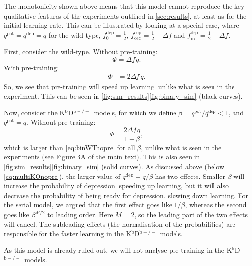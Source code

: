 \documentclass[10pt]{article}
\newcommand{\pot}{^{\text{pot}}}
\newcommand{\dep}{^{\text{dep}}}
\newcommand{\inc}{_{\text{inc}}}
\newcommand{\dec}{_{\text{dec}}}
\newcommand{\KO}{K$^\mathrm{b}$D$^{\mathrm{b}-/-}$}
\newcommand{\modelfig}[1][A]{Figure 3#1 of the main text}
\begin{document}
The monotonicity shown above means that this model cannot reproduce the key qualitative features of the experiments outlined in \autoref{sec:results}, at least as for the initial learning rate.
This can be illustrated by looking at a special case, where $q\pot = q\dep = q$ for the wild type, $f\dep_0 = \frac{1}{2}$, $f\dep\dec = \frac{1}{2} - \Delta f$ and $f\dep\inc = \frac{1}{2} - \Delta f$.

First, consider the wild-type.
Without pre-training:
%
\begin{equation}\label{eq:binWTnopre}
  \Phi = {\Delta f}\, q.
\end{equation}
%
With pre-training:
%
\begin{equation}\label{eq:binWTpre}
\begin{aligned}
  \Phi &= 2{\Delta f}\, q.
\end{aligned}
\end{equation}
%
So, we see that pre-training will speed up learning, unlike what is seen in the experiment.
This can be seen in
\autoref{fig:sim_results}\ref{fig:binary_sim} %
(black curves).

Now, consider the \KO\ models, for which we define $\beta=q\pot/q\dep<1$, and $q\pot=q$.
Without pre-training:
%
\begin{equation}\label{eq:binKOnopre}
  \Phi = \frac{2{\Delta f}\, q}{1+\beta},
\end{equation}
%
which is larger than \eqref{eq:binWTnopre} for all $\beta$, unlike what is seen in the experiments (see \modelfig).
This is also seen in
\autoref{fig:sim_results}\ref{fig:binary_sim} %
(solid curves).
As discussed above (below \eqref{eq:multiKOnopre}), the larger value of $q\dep=q/\beta$ has two effects.
Smaller $\beta$ will increase the probability of depression, speeding up learning, but it will also decrease the probability of being ready for depression, slowing down learning.
For the serial model, we argued that the first effect goes like $1/\beta$, whereas the second goes like $\beta^{M/2}$ to leading order.
Here $M=2$, so the leading part of the two effects will cancel.
The subleading effects (the normalisation of the probabilities) are responsible for the faster learning in the \KO\ models.

As this model is already ruled out, we will not analyse pre-training in the \KO\ models.
\end{document}
